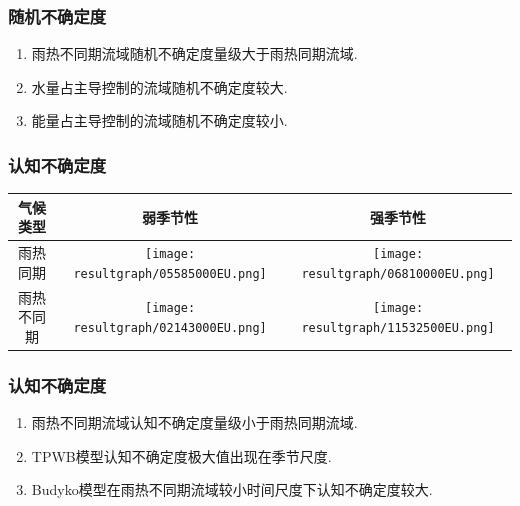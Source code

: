 \documentclass{beamer}
\begin{document}
\begin{CJK}{UTF8}{gkai}
\frame
{
\frametitle{随机不确定度}
\begin{enumerate}
\item 雨热不同期流域随机不确定度量级大于雨热同期流域.
\item 水量占主导控制的流域随机不确定度较大.
\item 能量占主导控制的流域随机不确定度较小.
\end{enumerate}
}



\frame
{
\frametitle{认知不确定度}
\begin{table}  \small
\resizebox{\textwidth}{!}
{
\centering
\begin{tabular}{ccc}
\hline
气候类型& 弱季节性 & 强季节性 \\
\hline
雨热同期
&\begin{minipage}{.6\textwidth}\texttt{[image: resultgraph/05585000EU.png]}\end{minipage}

&\begin{minipage}{.6\textwidth}\texttt{[image: resultgraph/06810000EU.png]}\end{minipage}
\\
雨热不同期
&\begin{minipage}{.6\textwidth}\texttt{[image: resultgraph/02143000EU.png]}\end{minipage}
 
&\begin{minipage}{.6\textwidth}\texttt{[image: resultgraph/11532500EU.png]}\end{minipage}
\\
\hline
\end{tabular}
}
\end{table} 
}

\frame
{
\frametitle{认知不确定度}
\begin{enumerate}
\item 雨热不同期流域认知不确定度量级小于雨热同期流域.
\item TPWB模型认知不确定度极大值出现在季节尺度.
\item Budyko模型在雨热不同期流域较小时间尺度下认知不确定度较大.
\end{enumerate}
}
  

\end{CJK}
\end{document}
